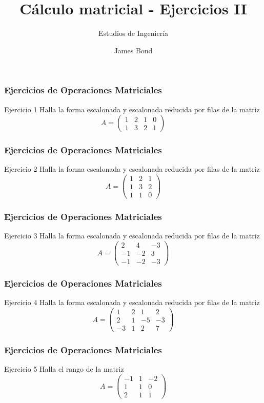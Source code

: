 \documentclass[aspectratio=169]{beamer}
\title[Tema 1 - Matrices, sistemas y determinantes]{C\'{a}lculo matricial - Ejercicios II}
\subtitle{Estudios de Ingenier\'ia}
\author[James Bond]{
James Bond%
}
\date{}
\begin{document}
 

\frame{\titlepage}

\begin{frame}
  \frametitle{Ejercicios de Operaciones Matriciales}
  \begin{block}{Ejercicio 1}
Halla la forma escalonada y escalonada reducida por filas de la matriz
\[
A= \left(\begin{array}{rrrr}
1&2&1&0\\
1&3&2&1
\end{array}\right)
\]
  \end{block}
\end{frame}

\begin{frame}
  \frametitle{Ejercicios de Operaciones Matriciales}
  \begin{block}{Ejercicio 2}
Halla la forma escalonada y escalonada reducida por filas de la matriz
\[
A= \left(\begin{array}{rrr}
1&2&1\\
1&3&2\\
1&1&0
\end{array}\right)
\]
  \end{block}
\end{frame}


\begin{frame}
  \frametitle{Ejercicios de Operaciones Matriciales}
  \begin{block}{Ejercicio 3}
Halla la forma escalonada y escalonada reducida por filas de la matriz
\[
A= \left(\begin{array}{rrr}
2&4&-3\\
-1&-2&3\\
-1&-2&-3
\end{array}\right)
\]
  \end{block}
\end{frame}

\begin{frame}
  \frametitle{Ejercicios de Operaciones Matriciales}
  \begin{block}{Ejercicio 4}
Halla la forma escalonada y escalonada reducida por filas de la matriz
\[
A= \left(\begin{array}{rrrr}
1&2&1&2\\
2&1&-5&-3\\
-3&1&2&7
\end{array}\right)
\]
  \end{block}
\end{frame}

\begin{frame}
  \frametitle{Ejercicios de Operaciones Matriciales}
  \begin{block}{Ejercicio 5}
Halla el rango de la matriz
\[
A= \left(\begin{array}{rrr}
-1&1&-2\\
1&1&0\\
2&1&1
\end{array}\right)
\]
  \end{block}
\end{frame}
\end{document}
